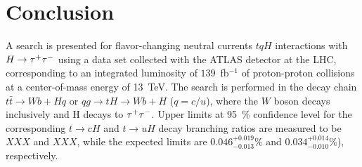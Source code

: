 \section{Conclusion}
\label{sec:conclusion}

A search is presented for flavor-changing neutral currents $tqH$ interactions with $H\to\tau^{+}\tau^{-}$ using a data set collected with the ATLAS
detector at the LHC, corresponding to an integrated luminosity of $139$~fb$^{-1}$ of proton-proton collisions at a center-of-mass energy of 13~TeV.
The search is performed in the decay chain $t\bar{t} \to Wb+Hq$ or $qg \to tH \to Wb+H$ ($q=c/u$), where the $W$ boson decays inclusively and
H decays to $\tau^{+}\tau^{-}$. Upper limits at 95~\% confidence level for the corresponding $t\to cH$ and $t\to uH$ decay branching ratios are measured
to be $XXX$ and $XXX$, while the expected limits are $0.046^{+0.019}_{-0.013}\%$ and $0.034^{+0.014}_{-0.010}\%$), respectively.
